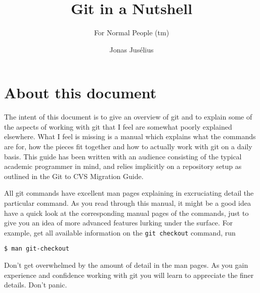 \documentclass[a4paper,10pt]{article}
\begin{document}
\pagestyle{fancy}
\fancyfoot{}
\fancyhead{}
\renewcommand{\sectionmark}[1]{\markboth{\sf\thesection.\ #1}{}}
\renewcommand{\subsectionmark}[1]{}
\fancyhead[R]{{\rmfamily\thepage}}
\newcommand{\Ref}[1]{section~\ref{#1}, p.~\pageref{#1}}

\title{Git in a Nutshell}

\subtitle{For Normal People (tm)}
\author{{\sf Jonas Jus\'elius}}
\address{
{\tt <jonas.juselius@chem.uit.no>}\\
{\sf Centre for Theoretical and Computational Chemistry}\\
{\sf University of Tromsø}\\
{\sf N-9037 University of Tromsø, Norway}
}


\maketitle
\tableofcontents
\newpage

\section*{About this document}
The intent of this document is to give an overview of git and to explain some of
the aspects of working with git that I feel are somewhat poorly explained
elsewhere. 
What I feel is missing is a manual which explains what the commands are for,
how the pieces fit together and how to actually work with git on a daily
basis. This guide has been written with an audience consisting of the typical
academic programmer in mind, and relies implicitly on a repository setup as
outlined in the Git to CVS Migration Guide.

All git commands have excellent man pages explaining in
excruciating detail the particular command. As you read through this manual,
it might be a good idea have a quick look at the corresponding manual pages of
the commands, just to give you an idea of more advanced features lurking under
the surface. For example, get all available information on the
\texttt{git checkout} command, run
\begin{verbatim}
$ man git-checkout
\end{verbatim}
Don't get overwhelmed by the amount of detail in the man pages. As
you gain experience and confidence working with git you will learn to
appreciate the finer details. Don't panic.
\end{document}
